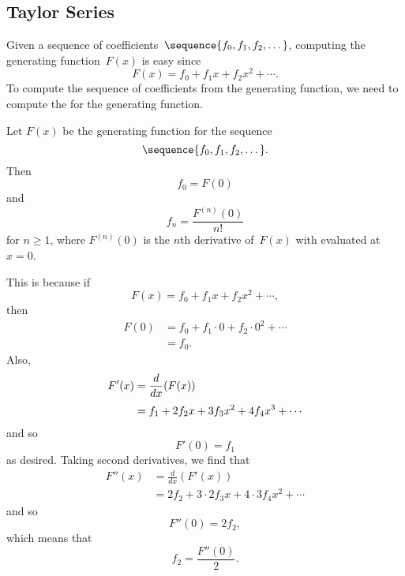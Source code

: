 \subsection{Taylor Series}

Given a sequence of coefficients~$\sequence{f_0, f_1, f_2, \dots}$,
computing the generating function~$F(x)$ is easy since
\begin{equation*}
    F(x) = f_0 + f_1 x + f_2 x^2 + \cdots.
\end{equation*}
To compute the sequence of coefficients from the generating function,
we need to compute the  for the generating
function.

\begin{rul}
Let $F(x)$ be the generating function for the sequence
\begin{equation*}
\sequence{f_0, f_1, f_2, \dots}.
\end{equation*}
Then
\begin{equation*}
    f_0 = F(0)
\end{equation*}
and
\begin{equation*}
    f_n = \frac{F^{(n)}(0)}{n!}
\end{equation*}
for $n \ge 1$, where $F^{(n)}(0)$ is the $n$th derivative of~$F(x)$
with evaluated at~$x = 0$.
\end{rul}

This is because if
\begin{equation*}
    F(x) = f_0 + f_1 x + f_2 x^2 + \cdots,
\end{equation*}
then
\begin{align*}
    F(0) &= f_0 + f_1 \cdot 0 + f_2 \cdot 0^2 + \cdots \\
         &= f_0.
\end{align*}
Also,
\begin{align*}
F'(x)   &= \frac{d}{dx} (F(x)) \\[\jot]
        &= f_1 + 2 f_2 x + 3 f_3 x^2 + 4 f_4 x^3 + \cdots
\end{align*}
and so
\begin{equation*}
    F'(0) = f_1
\end{equation*}
as desired.  Taking second derivatives, we find that
\begin{align*}
F''(x)  &= \frac{d}{dx} (F'(x)) \\
        &= 2 f_2 + 3 \cdot 2 f_3 x + 4 \cdot 3 f_4 x^2 + \cdots
\end{align*}
and so
\begin{equation*}
    F''(0) = 2 f_2,
\end{equation*}
which means that
\begin{equation*}
    f_2 = \frac{F''(0)}{2}.
\end{equation*}

